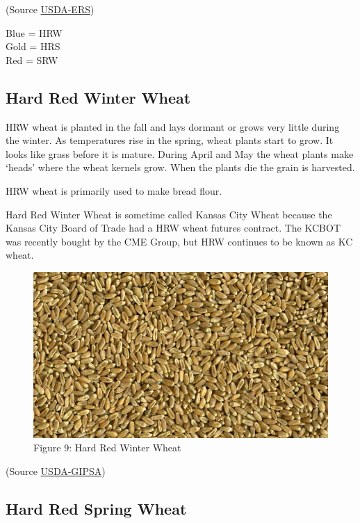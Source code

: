 \documentclass[]{book}
\theoremstyle{definition}
\theoremstyle{definition}
\theoremstyle{remark}
\begin{document}
(Source
\href{https://wayback.archive-it.org/5923/20120310141642/http://ers.usda.gov/Briefing/Wheat/maps.htm}{USDA-ERS})

Blue = HRW\\
Gold = HRS\\
Red = SRW

\subsection{Hard Red Winter Wheat}\label{hard-red-winter-wheat}

HRW wheat is planted in the fall and lays dormant or grows very little
during the winter. As temperatures rise in the spring, wheat plants
start to grow. It looks like grass before it is mature. During April and
May the wheat plants make `heads' where the wheat kernels grow. When the
plants die the grain is harvested.

HRW wheat is primarily used to make bread flour.

Hard Red Winter Wheat is sometime called Kansas City Wheat because the
Kansas City Board of Trade had a HRW wheat futures contract. The KCBOT
was recently bought by the CME Group, but HRW continues to be known as
KC wheat.

\begin{figure}[htbp]
\centering
\includegraphics{images/HRW-Wheat.jpg}
\caption{Figure 9: Hard Red Winter Wheat}
\end{figure}

(Source
\href{https://www.gipsa.usda.gov/fgis/commgallery/gr_hrw.aspx}{USDA-GIPSA})

\subsection{Hard Red Spring Wheat}\label{hard-red-spring-wheat}
\end{document}
